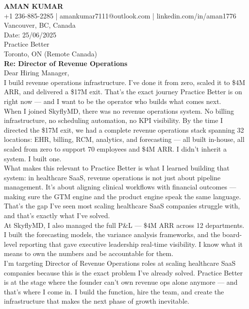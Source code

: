 \documentclass[11pt]{article}
\begin{document}
\textbf{AMAN KUMAR}\\[4pt]
+1 236-885-2285  |  amankumar7111@outlook.com  |  linkedin.com/in/aman1776\\
Vancouver, BC, Canada\\[12pt]

Date: 25/06/2025\\[12pt]

Practice Better\\
Toronto, ON (Remote Canada)\\[12pt]

\textbf{Re: Director of Revenue Operations}\\[12pt]

Dear Hiring Manager,\\[8pt]

I build revenue operations infrastructure. I've done it from zero, scaled it to \$4M ARR, and delivered a
\$17M exit. That's the exact journey Practice Better is on right now --- and I want to be the operator who
builds what comes next.\\[8pt]

When I joined SkyflyMD, there was no revenue operations system. No billing infrastructure, no scheduling
automation, no KPI visibility. By the time I directed the \$17M exit, we had a complete revenue operations
stack spanning 32 locations: EHR, billing, RCM, analytics, and forecasting --- all built in-house, all
scaled from zero to support 70 employees and \$4M ARR. I didn't inherit a system. I built one.\\[8pt]

What makes this relevant to Practice Better is what I learned building that system: in healthcare SaaS, revenue
operations is not just about pipeline management. It's about aligning clinical workflows with financial
outcomes --- making sure the GTM engine and the product engine speak the same language. That's the gap I've
seen most scaling healthcare SaaS companies struggle with, and that's exactly what I've solved.\\[8pt]

At SkyflyMD, I also managed the full P\&L --- \$4M ARR across 12 departments. I built the forecasting models,
the variance analysis frameworks, and the board-level reporting that gave executive leadership real-time
visibility. I know what it means to own the numbers and be accountable for them.\\[8pt]

I'm targeting Director of Revenue Operations roles at scaling healthcare SaaS companies because this is the
exact problem I've already solved. Practice Better is at the stage where the founder can't own revenue ops
alone anymore --- and that's where I come in. I build the function, hire the team, and create the
infrastructure that makes the next phase of growth inevitable.\\[8pt]
\end{document}
